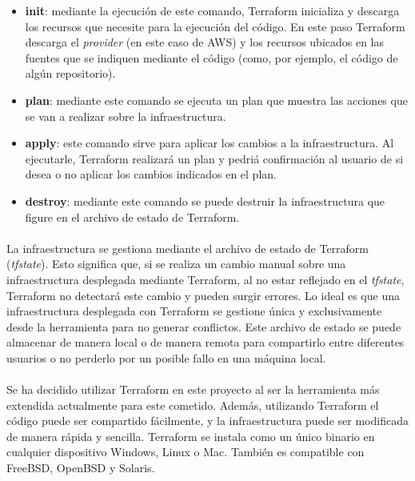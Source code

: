 \documentclass[../../memoria.tex]{subfiles}
\begin{document}
\begin{itemize}
    \item \textbf{init}: mediante la ejecución de este comando, Terraform inicializa y descarga los recursos que necesite para la ejecución del código. En este paso Terraform descarga el \textit{provider} (en este caso de AWS) y los recursos ubicados en las fuentes que se indiquen mediante el código (como, por ejemplo, el código de algún repositorio).

    \item \textbf{plan}: mediante este comando se ejecuta un plan que muestra las acciones que se van a realizar sobre la infraestructura.

    \item \textbf{apply}: este comando sirve para aplicar los cambios a la infraestructura. Al ejecutarle, Terraform realizará un plan y pedriá confirmación al usuario de si desea o no aplicar los cambios indicados en el plan.

    \item \textbf{destroy}: mediante este comando se puede destruir la infraestructura que figure en el archivo de estado de Terraform.
\end{itemize}

\paragraph{}
La infraestructura se gestiona mediante el archivo de estado de Terraform (\textit{tfstate}). Esto significa que, si se realiza un cambio manual sobre una infraestructura desplegada mediante Terraform, al no estar reflejado en el \textit{tfstate}, Terraform no detectará este cambio y pueden surgir errores. Lo ideal es que una infraestructura desplegada con Terraform se gestione única y exclusivamente desde la herramienta para no generar conflictos. Este archivo de estado se puede almacenar de manera local o de manera remota para compartirlo entre diferentes usuarios o no perderlo por un posible fallo en una máquina local.

\paragraph{}
Se ha decidido utilizar Terraform en este proyecto al ser la herramienta más extendida actualmente para este cometido. Además, utilizando Terraform el código puede ser compartido fácilmente, y la infraestructura puede ser modificada de manera rápida y sencilla. Terraform se instala como un único binario en cualquier dispositivo Windows, Linux o Mac. También es compatible con FreeBSD, OpenBSD y Solaris.
\end{document}
